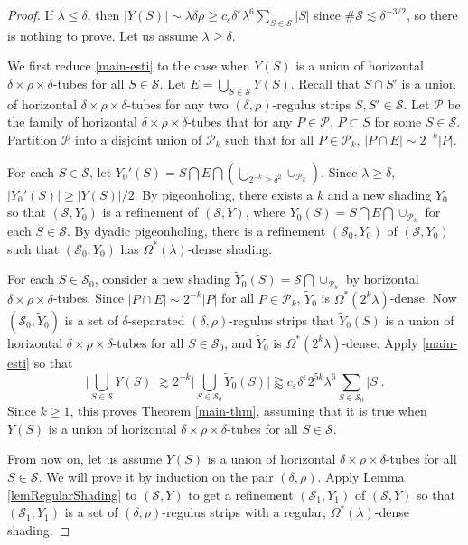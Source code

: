 \documentclass{amsart}%
\numberwithin{equation}{section}
\newcommand{\de}{\delta}
\newcommand{\e}{\varepsilon}
\newcommand{\la}{\lambda}
\newcommand{\Om}{\Omega}
\newcommand{\cs}{\mathcal S}
\newcommand{\cp}{\mathcal P}
\newcommand{\1}{\mathbbm{1}}
\begin{document}
\begin{proof}

If $\la\leq\de$, then $|Y(S)|\sim\la\de\rho\geq c_\e\de^{\e}\la^6\sum_{S\in\cs}|S|$ since $\#\cs\lesssim\de^{-3/2}$, so there is nothing to prove.
Let us assume $\la\geq\de$.

\smallskip

We first reduce \eqref{main-esti} to the case when $Y(S)$ is a union of horizontal $\de\times\rho\times\de$-tubes for all $S\in\cs$.
Let $E=\bigcup_{S\in\cs}Y(S)$.
Recall that $S\cap S'$ is a union of horizontal $\de\times\rho\times\de$-tubes  for any two $(\de,\rho)$-regulus strips $S,S'\in\cs$.
Let $\cp$ be the family of horizontal $\de\times\rho\times\de$-tubes that for any $P\in\cp$, $P\subset S$ for some $S\in\cs$.
Partition $\cp$ into a disjoint union of $\cp_k$ such that for all $P\in\cp_k$, $|P\cap E|\sim 2^{-k}|P|$. 

For each $S\in\cs$, let $Y_0'(S)=S\bigcap E\bigcap(\bigcup_{2^{-k}\geq\de^2}\cup_{\cp_k})$. 
Since $\la\geq\de$, $|Y_0'(S)|\geq|Y(S)|/2$.
By pigeonholing, there exists a $k$ and a new shading $Y_0$ so that $(\cs,Y_0)$ is a refinement of $(\cs, Y)$, where $Y_0(S)=S\bigcap E\bigcap\cup_{\cp_k}$ for each $S\in\cs$.
By dyadic pigeonholing, there is a refinement $(\cs_0, Y_0)$ of $(\cs, Y_0)$ such that $(\cs_0, Y_0)$ has $\Om^\ast(\la)$-dense shading.

For each $S\in\cs_0$, consider a new shading $\tilde Y_0(S)=\cs\bigcap \cup_{\cp_k}$ by horizontal $\de\times\rho\times\de$-tubes. 
Since $|P\cap E|\sim 2^{-k}|P|$ for all $P\in\cp_k$, $\tilde Y_0$ is $\Om^\ast(2^k\la)$-dense.
Now $(\cs_0,\tilde Y_0)$ is a set of $\de$-separated $(\de,\rho)$-regulus strips that $\tilde Y_0(S)$ is a union of horizontal $\de\times\rho\times\de$-tubes for all $S\in\cs_0$, and $\tilde Y_0$ is $\Om^\ast(2^k\la)$-dense.
Apply \eqref{main-esti} so that 
\begin{equation}
    \Big|\bigcup_{S\in\cs}Y(S)\Big|\gtrsim 2^{-k}\Big|\bigcup_{S\in\cs_0}\tilde Y_0(S)\Big|\gtrapprox c_\e\de^{\e}2^{5k}\la^6\sum_{S\in\cs_0}|S|.
\end{equation}
Since $k\geq1$, this proves Theorem \ref{main-thm}, assuming that it is true when $Y(S)$ is a union of horizontal $\de\times\rho\times\de$-tubes for all $S\in\cs$.


\medskip

From now on, let us assume $Y(S)$ is a union of horizontal $\de\times\rho\times\de$-tubes for all $S\in\cs$.
We will prove it by induction on the pair $(\de,\rho)$. 
Apply Lemma \ref{lemRegularShading} to $(\cs,Y)$ to get a refinement $(\cs_1,Y_1)$ of $(\cs,Y)$ so that $(\cs_1,Y_1)$ is a set of $(\de,\rho)$-regulus strips with a regular, $\Om^\ast(\la)$-dense shading. 




\end{proof}
\end{document}
